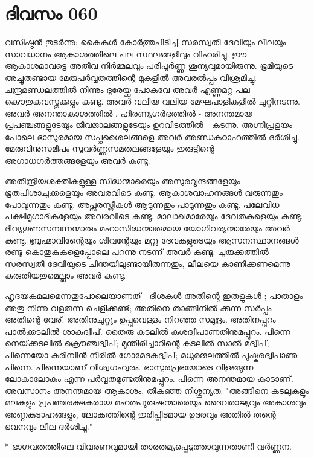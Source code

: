 \newpage
\section{ദിവസം 060}


വസിഷ്ഠന്‍ തുടര്‍ന്നു: കൈകള്‍ കോര്‍ത്തുപിടിച്ച്‌ സരസ്വതീ ദേവിയും ലീലയും സാവധാനം ആകാശത്തിലെ പല സ്ഥലങ്ങളിലും വിഹരിച്ചു. ഈ ആകാശമാവട്ടെ അതീവ നിര്‍മ്മലവും പരിപൂര്‍ണ്ണ ശൂന്യവുമായിരുന്നു. ഭൂമിയുടെ അച്ചുതണ്ടായ മേരുപര്‍വ്വതത്തിന്റെ മുകളില്‍ അവരല്‍പ്പം വിശ്രമിച്ചു. ചന്ദ്രമണ്ഡലത്തില്‍ നിന്നും ദൂരേയ്ക്കു പോകവേ അവര്‍ എണ്ണമറ്റ പല കൌതുകവസ്തുക്കളും കണ്ടു. അവര്‍ വലിയ വലിയ മേഘപാളികളില്‍ ചുറ്റിനടന്നു. അവര്‍ അനന്താകാശത്തില്‍ , ഹിരണ്യഗര്‍ഭത്തില്‍ - അനന്തമായ പ്രപഞ്ചങ്ങളുടേയും ജീവജാലങ്ങളുടേയും ഉറവിടത്തില്‍ - കടന്നു. അഗ്നിപ്രളയം പോലെ ഭാസുരമായ സപ്തശൈലങ്ങളെ അവര്‍ അണ്ഡകഠാഹത്തില്‍ ദര്‍ശിച്ചു. മേരുവിനുസമീപം സുവര്‍ണ്ണസമതലങ്ങളേയും ഇരുട്ടിന്റെ അഗാധഗര്‍ത്തങ്ങളേയും അവര്‍ കണ്ടു. 

അതീന്ദ്രിയശക്തികളുള്ള സിദ്ധന്മാരെയും അസുരവൃന്ദങ്ങളേയും ഭൂതപിശാചുക്കളെയും അവരവിടെ കണ്ടു. ആകാശവാഹനങ്ങള്‍ വരുന്നതും പോവുന്നതും കണ്ടു. അപ്സരസ്ത്രീകള്‍ ആടുന്നതും പാടുന്നതും കണ്ടു. പലേവിധ പക്ഷിമൃഗാദികളേയും അവരവിടെ കണ്ടു. മാലാഖമാരേയും ദേവതകളെയും കണ്ടു. ദിവ്യഗുണസമ്പന്നന്മാരും മഹാസിദ്ധന്മാരുമായ യോഗിവര്യന്മാരേയും അവര്‍ കണ്ടു. ബ്രഹ്മാവിന്റെേയും ശിവന്റേയും മറ്റു ദേവകളുടെയും ആസനസ്ഥാനങ്ങള്‍ രണ്ടു കൊതുകുകളെപ്പോലെ പറന്നു നടന്ന് അവര്‍ കണ്ടു. ചുരുക്കത്തില്‍ സരസ്വതീ ദേവിയുടെ ചിന്തയിലുണ്ടായിരുന്നതും, ലീലയെ കാണിക്കണമെന്നു കരുതിയതുമെല്ലാം അവര്‍ കണ്ടു.

ഹൃദയകമലമെന്നതുപോലെയാണത്‌ - ദിശകള്‍ അതിന്റെ ഇതളുകള്‍ ; പാതാളം അതു നിന്നു വളരുന്ന ചെളിക്കുണ്ട്‌; അതിനെ താങ്ങിനില്‍ ക്കുന്ന സര്‍പ്പം അതിന്റെ വേര്‌. അതിനുചുറ്റും ഉപ്പുവെള്ളം നിറഞ്ഞ സമുദ്രം. അതിനപ്പുറം പാല്‍ക്കടലില്‍ ശാകദ്വീപ്‌. തൈരു കടലില്‍ കുശദ്വീപാണതിനുമപ്പുറം. പിന്നെ നെയ്‌ക്കടലില്‍ ക്രൌഞ്ചദ്വീപ്‌; മുന്തിരിച്ചാറിന്റെ കടലില്‍ സാല്‍ മദ്വീപ്‌; പിന്നെയോ കരിമ്പിന്‍ നീരില്‍ ഗോമേദകദ്വീപ്‌; മധുരജലത്തില്‍ പുഷ്കരദ്വീപാണു പിന്നെ. പിന്നെയാണ്‌ വിശ്വഗഹ്വരം. ഭാസുരപ്രഭയോടെ വിളങ്ങുന്ന ലോകാലോകം എന്ന പര്‍വ്വതമുണ്ടതിനുമപ്പുറം. പിന്നെ അനന്തമായ കാടാണ്‌. അവസാനം അനന്തമായ ആകാശം, തികഞ്ഞ നിശ്ശൂന്യത. "അങ്ങിനെ കടലുകളും മലകളും പ്രപഞ്ചരക്ഷകരായ മഹത്പുരുഷന്മാരെയും ദൈവരാജ്യവും അകാശവും അണ്ഠകടാഹങ്ങളും, ലോകത്തിന്റെ ഇരിപ്പിടമായ ഉദരവും അതില്‍ തന്റെ ഭവനവും ലീല ദര്‍ശിച്ചു."

* ഭാഗവതത്തിലെ വിവരണവുമായി താരതമ്യപ്പെടുത്താവുന്നതാണീ വര്‍ണ്ണന.
